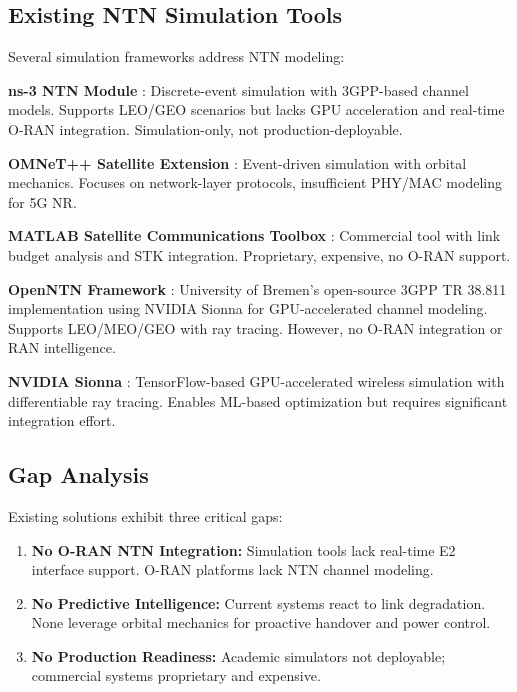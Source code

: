 \documentclass[conference]{IEEEtran}
\begin{document}
\subsection{Existing NTN Simulation Tools}

Several simulation frameworks address NTN modeling:

\textbf{ns-3 NTN Module} \cite{ns3_ntn}: Discrete-event simulation with 3GPP-based channel models. Supports LEO/GEO scenarios but lacks GPU acceleration and real-time O-RAN integration. Simulation-only, not production-deployable.

\textbf{OMNeT++ Satellite Extension} \cite{omnet_satellite}: Event-driven simulation with orbital mechanics. Focuses on network-layer protocols, insufficient PHY/MAC modeling for 5G NR.

\textbf{MATLAB Satellite Communications Toolbox} \cite{matlab_satellite}: Commercial tool with link budget analysis and STK integration. Proprietary, expensive, no O-RAN support.

\textbf{OpenNTN Framework} \cite{openntn_2025}: University of Bremen's open-source 3GPP TR 38.811 implementation using NVIDIA Sionna for GPU-accelerated channel modeling. Supports LEO/MEO/GEO with ray tracing. However, no O-RAN integration or RAN intelligence.

\textbf{NVIDIA Sionna} \cite{sionna_2022}: TensorFlow-based GPU-accelerated wireless simulation with differentiable ray tracing. Enables ML-based optimization but requires significant integration effort.

\subsection{Gap Analysis}

Existing solutions exhibit three critical gaps:

\begin{enumerate}
    \item \textbf{No O-RAN NTN Integration:} Simulation tools lack real-time E2 interface support. O-RAN platforms lack NTN channel modeling.

    \item \textbf{No Predictive Intelligence:} Current systems react to link degradation. None leverage orbital mechanics for proactive handover and power control.

    \item \textbf{No Production Readiness:} Academic simulators not deployable; commercial systems proprietary and expensive.
\end{enumerate}
\end{document}
